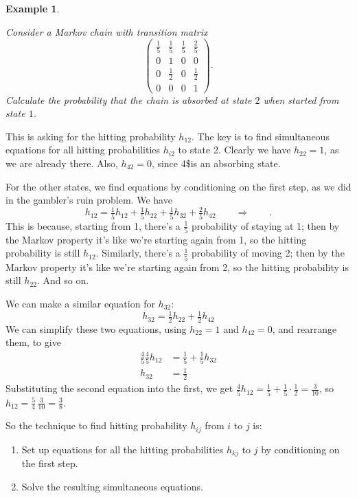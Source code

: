 \documentclass[
  a4paper,
]{article}
\providecommand{\tightlist}{%
  \setlength{\itemsep}{0pt}\setlength{\parskip}{0pt}}
\theoremstyle{definition}
\theoremstyle{definition}
\newtheorem{example}{Example}[section]
\theoremstyle{definition}
\theoremstyle{remark}
\begin{document}
\begin{example}
\protect\hypertarget{exm:hitting1}{}\label{exm:hitting1}

\emph{Consider a Markov chain with transition matrix}
\[ \begin{pmatrix}
\frac15 & \frac15 & \frac15 & \frac25 \\[0.3ex]
0 & 1 & 0 & 0 \\[0.3ex]
0 & \frac12 & 0 & \frac12 \\[0.3ex]
0 & 0 & 0 & 1
\end{pmatrix} . \]
\emph{Calculate the probability that the chain is absorbed at state \(2\) when started from state \(1\).}

This is asking for the hitting probability \(h_{12}\). The key is to find simultaneous equations for all hitting probabilities \(h_{i2}\) to state 2. Clearly we have \(h_{22} = 1\), as we are already there. Also, \(h_{42} = 0\), since 4\$is an absorbing state.

For the other states, we find equations by conditioning on the first step, as we did in the gambler's ruin problem. We have
\[ h_{12} = \tfrac15 h_{12} + \tfrac15 h_{22} + \tfrac15 h_{32} + \tfrac25h_{42} \qquad \Rightarrow \qquad . \]
This is because, starting from 1, there's a \(\frac15\) probability of staying at 1; then by the Markov property it's like we're starting again from 1, so the hitting probability is still \(h_{12}\). Similarly, there's a \(\frac15\) probability of moving 2; then by the Markov property it's like we're starting again from 2, so the hitting probability is still \(h_{22}\). And so on.

We can make a similar equation for \(h_{32}\):
\[ h_{32} = \tfrac12 h_{22} + \tfrac12 h_{42} 
\]
We can simplify these two equations, using \(h_{22} = 1\) and \(h_{42} = 0\), and rearrange them, to give
\begin{align*}
\tfrac45 \tfrac45 h_{12} &= \tfrac15  + \tfrac15 h_{32}\\
h_{32} &= \tfrac12
\end{align*}
Substituting the second equation into the first, we get \(\frac45 h_{12} = \frac1{5} + \frac15\cdot\frac12 =\frac{3}{10}\), so \(h_{12} = \frac{5}{4}\,\frac{3}{10} = \frac{3}{8}\).

\end{example}

So the technique to find hitting probability \(h_{ij}\) from \(i\) to \(j\) is:

\begin{enumerate}
\def\labelenumi{\arabic{enumi}.}
\tightlist
\item
  Set up equations for all the hitting probabilities \(h_{kj}\) to \(j\) by conditioning on the first step.
\item
  Solve the resulting simultaneous equations.
\end{enumerate}
\end{document}
